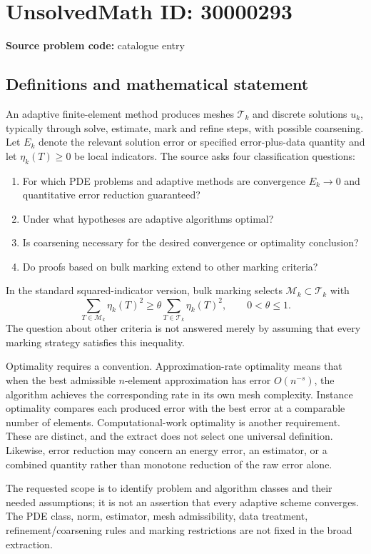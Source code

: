 \documentclass[11pt]{article}
\begin{document}
\section*{UnsolvedMath ID: 30000293}
\textbf{Source problem code:} catalogue entry
\subsection{Definitions and mathematical statement}
An adaptive finite-element method produces meshes $\mathcal T_k$ and discrete solutions $u_k$, typically through solve, estimate, mark and refine steps, with possible coarsening. Let $E_k$ denote the relevant solution error or specified error-plus-data quantity and let $\eta_k(T)\ge0$ be local indicators. The source asks four classification questions:
\begin{enumerate}
\item For which PDE problems and adaptive methods are convergence $E_k\to0$ and quantitative error reduction guaranteed?
\item Under what hypotheses are adaptive algorithms optimal?
\item Is coarsening necessary for the desired convergence or optimality conclusion?
\item Do proofs based on bulk marking extend to other marking criteria?
\end{enumerate}
In the standard squared-indicator version, bulk marking selects $\mathcal M_k\subset\mathcal T_k$ with
\[
 \sum_{T\in\mathcal M_k}\eta_k(T)^2
 \ge\theta\sum_{T\in\mathcal T_k}\eta_k(T)^2,
 \qquad0<\theta\le1.
\]
The question about other criteria is not answered merely by assuming that every marking strategy satisfies this inequality.

Optimality requires a convention. Approximation-rate optimality means that when the best admissible $n$-element approximation has error $O(n^{-s})$, the algorithm achieves the corresponding rate in its own mesh complexity. Instance optimality compares each produced error with the best error at a comparable number of elements. Computational-work optimality is another requirement. These are distinct, and the extract does not select one universal definition. Likewise, error reduction may concern an energy error, an estimator, or a combined quantity rather than monotone reduction of the raw error alone.

The requested scope is to identify problem and algorithm classes and their needed assumptions; it is not an assertion that every adaptive scheme converges. The PDE class, norm, estimator, mesh admissibility, data treatment, refinement/coarsening rules and marking restrictions are not fixed in the broad extraction.
\end{document}
